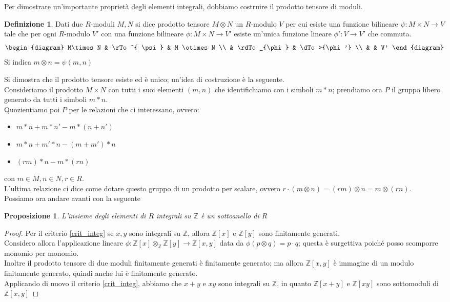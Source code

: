 \documentclass[11pt]{article}
\theoremstyle{plain}
\newtheorem{prop}[thm]{Proposizione}
\theoremstyle{definition}
\newtheorem{defn}{Definizione}[section]
\theoremstyle{remark}
\newcommand{\Z}{\mathbb{Z}}
\newcommand{\tridiag}[6]{
	  \begin{diagram}
	  #1 & \rTo^{#2}  & #3        \\
	     & \rdTo_{#6} & \dTo>{#4}   \\
	     &          & #5
	  \end{diagram}
}
\begin{document}
  Per dimostrare un'importante proprietà degli elementi integrali, dobbiamo costruire il prodotto tensore di moduli.\\
  \begin{defn}
   Dati due $R$-moduli $M,N$ si dice prodotto tensore $M\otimes N$ un $R$-modulo $V$ per cui esiste una funzione bilineare $\psi:M\times N\to V$ tale che per ogni $R$-modulo $V'$ con una funzione bilineare $\phi:M\times N\to V'$ esiste un'unica funzione lineare $\phi':V\to V'$ che commuta.
   \[\tridiag{M\times N}{ \psi }{M \otimes N}{\phi'}{V'}{\phi}\]
   Si indica $m\otimes n=\psi(m,n)$
  \end{defn}
  Si dimostra che il prodotto tensore esiste ed è unico; un'idea di costruzione è la seguente.\\
  Consideriamo il prodotto $M\times N$ con tutti i suoi elementi $(m,n)$ che identifichiamo con i simboli $m\ast n$; prendiamo ora $P$ il gruppo libero generato da tutti i simboli $m\ast n$.\\
  Quozientiamo poi $P$ per le relazioni che ci interessano, ovvero:
  \begin{itemize}
   \item $m\ast n+m\ast n'-m\ast(n+n')$
   \item $m\ast n+m'\ast n-(m+m')\ast n$
   \item $(rm)\ast n-m\ast(rn)$
  \end{itemize}
  con $m\in M,n\in N,r\in R$.\\
  L'ultima relazione ci dice come dotare questo gruppo di un prodotto per scalare, ovvero $r\cdot(m\otimes n)=(rm)\otimes n=m\otimes(rn)$.\\
  Possiamo ora andare avanti con la seguente
  \begin{prop}
   L'insieme degli elementi di $R$ integrali su $\Z$ è un sottoanello di $R$
  \end{prop}
  \begin{proof}
   Per il criterio \ref{crit_integ} se $x,y$ sono integrali su $\Z$, allora $\Z[x]$ e $\Z[y]$ sono finitamente generati.\\
   Considero allora l'applicazione lineare $\phi:\Z[x]\otimes_\Z\Z[y]\to\Z[x,y]$ data da $\phi(p\otimes q)=p\cdot q$; questa è surgettiva poiché posso scomporre monomio per monomio.\\
   Inoltre il prodotto tensore di due moduli finitamente generati è finitamente generato; ma allora $\Z[x,y]$ è immagine di un modulo finitamente generato, quindi anche lui è finitamente generato.\\
   Applicando di nuovo il criterio \ref{crit_integ}, abbiamo che $x+y$ e $xy$ sono integrali su $\Z$, in quanto $\Z[x+y]$ e $\Z[xy]$ sono sottomoduli di $\Z[x,y]$
  \end{proof}
\end{document}
